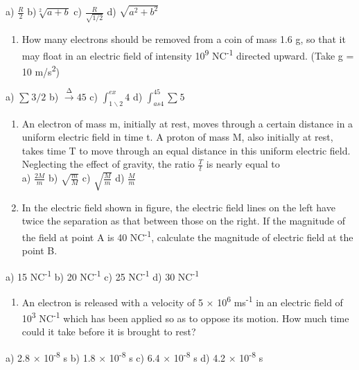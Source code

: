 a) \(\frac{R}{2}\) b)\(\sqrt[2]{a + b}\) c) \(\frac{R}{\sqrt{1/2}}\) d)
\(\sqrt{a^{2} + b^{2}}\)

\begin{enumerate}
\def\labelenumi{\arabic{enumi}.}
\setcounter{enumi}{20}
\item
  How many electrons should be removed from a coin of mass 1.6 g, so
  that it may float in an electric field of intensity
  10\textsuperscript{9} NC\textsuperscript{-1} directed upward. (Take g
  = 10 m/s\textsuperscript{2})
\end{enumerate}

a) \(\sum_{}^{}{3/2}\) b) \(\overset{\mathrm{\Delta}}{\rightarrow}45\)
c) \(\int_{1\backslash 2}^{ex}4\) d) \(\int_{as4}^{45}{\sum_{}^{}5}\)

\begin{enumerate}
\def\labelenumi{\arabic{enumi}.}
\setcounter{enumi}{21}
\item
  An electron of mass m, initially at rest, moves through a certain
  distance in a uniform electric field in time t. A proton of mass M,
  also initially at rest, takes time T to move through an equal distance
  in this uniform electric field. Neglecting the effect of gravity, the
  ratio \(\frac{T}{t}\) is nearly equal to\\
  a) \(\frac{2M}{m}\) b) \(\sqrt{\frac{m}{M}}\) c)
  \(\sqrt{\frac{M}{m}}\) d) \(\frac{M}{m}\)
\item
  In the electric field shown in figure, the electric field lines on the
  left have twice the separation as that between those on the right. If
  the magnitude of the field at point A is 40 NC\textsuperscript{-1},
  calculate the magnitude of electric field at the point B.
\end{enumerate}

a) 15 NC\textsuperscript{-1} b) 20 NC\textsuperscript{-1} c) 25
NC\textsuperscript{-1} d) 30 NC\textsuperscript{-1}

\begin{enumerate}
\def\labelenumi{\arabic{enumi}.}
\setcounter{enumi}{23}
\item
  An electron is released with a velocity of 5 × 10\textsuperscript{6}
  ms\textsuperscript{-1} in an electric field of 10\textsuperscript{3}
  NC\textsuperscript{-1} which has been applied so as to oppose its
  motion. How much time could it take before it is brought to rest?
\end{enumerate}

a) 2.8 × 10\textsuperscript{-8} s b) 1.8 × 10\textsuperscript{-8} s c)
6.4 × 10\textsuperscript{-8} s d) 4.2 × 10\textsuperscript{-8} s

